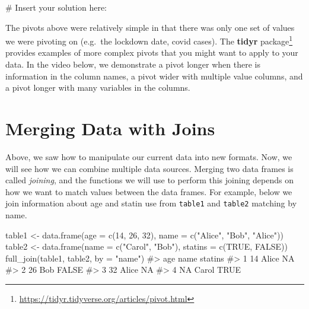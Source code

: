 \documentclass[
  letterpaper,
]{krantz}
\makeatletter
\newenvironment{Shaded}{\begin{snugshade}}{\end{snugshade}}
\newcommand{\AttributeTok}[1]{\textcolor[rgb]{0.40,0.45,0.13}{#1}}
\newcommand{\CommentTok}[1]{\textcolor[rgb]{0.37,0.37,0.37}{#1}}
\newcommand{\ConstantTok}[1]{\textcolor[rgb]{0.56,0.35,0.01}{#1}}
\newcommand{\DecValTok}[1]{\textcolor[rgb]{0.68,0.00,0.00}{#1}}
\newcommand{\FunctionTok}[1]{\textcolor[rgb]{0.28,0.35,0.67}{#1}}
\newcommand{\NormalTok}[1]{\textcolor[rgb]{0.00,0.23,0.31}{#1}}
\newcommand{\OtherTok}[1]{\textcolor[rgb]{0.00,0.23,0.31}{#1}}
\newcommand{\StringTok}[1]{\textcolor[rgb]{0.13,0.47,0.30}{#1}}
\renewcommand{\href}[2]{#2\footnote{\url{#1}}}
\newenvironment{kframe}{%
\medskip{}
\setlength{\fboxsep}{.8em}
 \def\at@end@of@kframe{}%
 \ifinner\ifhmode%
  \def\at@end@of@kframe{\end{minipage}}%
  \begin{minipage}{\columnwidth}%
 \fi\fi%
 \def\FrameCommand##1{\hskip\@totalleftmargin \hskip-\fboxsep
 \colorbox{shadecolor}{##1}\hskip-\fboxsep
     \hskip-\linewidth \hskip-\@totalleftmargin \hskip\columnwidth}%
 \MakeFramed {\advance\hsize-\width
   \@totalleftmargin\z@ \linewidth\hsize
   \@setminipage}}%
 {\par\unskip\endMakeFramed%
 \at@end@of@kframe}
\renewenvironment{Shaded}{\begin{kframe}}{\end{kframe}}
\makeatother
\begin{document}
\begin{Shaded}
\begin{Highlighting}[]
\CommentTok{\# Insert your solution here:}
\end{Highlighting}
\end{Shaded}

The pivots above were relatively simple in that there was only one set
of values we were pivoting on (e.g.~the lockdown date, covid cases). The
\href{https://tidyr.tidyverse.org/articles/pivot.html}{\textbf{tidyr}
package} provides examples of more complex pivots that you might want to
apply to your data. In the video below, we demonstrate a pivot longer
when there is information in the column names, a pivot wider with
multiple value columns, and a pivot longer with many variables in the
columns.

\hypertarget{merging-data-with-joins}{%
\section{Merging Data with Joins}\label{merging-data-with-joins}}

Above, we saw how to manipulate our current data into new formats. Now,
we will see how we can combine multiple data sources. Merging two data
frames is called \emph{joining}, and the functions we will use to
perform this joining depends on how we want to match values between the
data frames. For example, below we join information about age and statin
use from \texttt{table1} and \texttt{table2} matching by name.

\begin{Shaded}
\begin{Highlighting}[]
\NormalTok{table1 }\OtherTok{\textless{}{-}} \FunctionTok{data.frame}\NormalTok{(}\AttributeTok{age =} \FunctionTok{c}\NormalTok{(}\DecValTok{14}\NormalTok{, }\DecValTok{26}\NormalTok{, }\DecValTok{32}\NormalTok{), }\AttributeTok{name =} \FunctionTok{c}\NormalTok{(}\StringTok{"Alice"}\NormalTok{, }\StringTok{"Bob"}\NormalTok{, }\StringTok{"Alice"}\NormalTok{))}
\NormalTok{table2 }\OtherTok{\textless{}{-}} \FunctionTok{data.frame}\NormalTok{(}\AttributeTok{name =} \FunctionTok{c}\NormalTok{(}\StringTok{"Carol"}\NormalTok{, }\StringTok{"Bob"}\NormalTok{), }\AttributeTok{statins =} \FunctionTok{c}\NormalTok{(}\ConstantTok{TRUE}\NormalTok{, }\ConstantTok{FALSE}\NormalTok{))}
\FunctionTok{full\_join}\NormalTok{(table1, table2, }\AttributeTok{by =} \StringTok{"name"}\NormalTok{)}
\CommentTok{\#\textgreater{}   age  name statins}
\CommentTok{\#\textgreater{} 1  14 Alice      NA}
\CommentTok{\#\textgreater{} 2  26   Bob   FALSE}
\CommentTok{\#\textgreater{} 3  32 Alice      NA}
\CommentTok{\#\textgreater{} 4  NA Carol    TRUE}
\end{Highlighting}
\end{Shaded}
\end{document}
